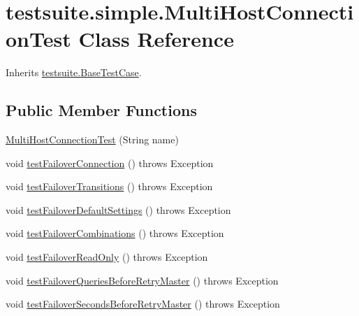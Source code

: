 \hypertarget{classtestsuite_1_1simple_1_1_multi_host_connection_test}{}\section{testsuite.\+simple.\+Multi\+Host\+Connection\+Test Class Reference}
\label{classtestsuite_1_1simple_1_1_multi_host_connection_test}


Inherits \mbox{\hyperlink{classtestsuite_1_1_base_test_case}{testsuite.\+Base\+Test\+Case}}.

\subsection*{Public Member Functions}
\begin{DoxyCompactItemize}
\item 
\mbox{\hyperlink{classtestsuite_1_1simple_1_1_multi_host_connection_test_a56eb52dfde0f334b08b56d1065f60104}{Multi\+Host\+Connection\+Test}} (String name)
\item 
void \mbox{\hyperlink{classtestsuite_1_1simple_1_1_multi_host_connection_test_ad753dcc54daa643efb93bb6296b446fb}{test\+Failover\+Connection}} ()  throws Exception 
\item 
void \mbox{\hyperlink{classtestsuite_1_1simple_1_1_multi_host_connection_test_ac73ab69db61b63a684b6d229fb83e97b}{test\+Failover\+Transitions}} ()  throws Exception 
\item 
void \mbox{\hyperlink{classtestsuite_1_1simple_1_1_multi_host_connection_test_ab41d61126e424b0903c7a6411d40a213}{test\+Failover\+Default\+Settings}} ()  throws Exception 
\item 
void \mbox{\hyperlink{classtestsuite_1_1simple_1_1_multi_host_connection_test_a3d67cb5298918a721fd213e23aad5d22}{test\+Failover\+Combinations}} ()  throws Exception 
\item 
void \mbox{\hyperlink{classtestsuite_1_1simple_1_1_multi_host_connection_test_a584998fbe06309864c8e535923ca3c2f}{test\+Failover\+Read\+Only}} ()  throws Exception 
\item 
void \mbox{\hyperlink{classtestsuite_1_1simple_1_1_multi_host_connection_test_a4497dff5cf4989cdacb5d7a771f8469a}{test\+Failover\+Queries\+Before\+Retry\+Master}} ()  throws Exception 
\item 
void \mbox{\hyperlink{classtestsuite_1_1simple_1_1_multi_host_connection_test_aac51a7111324e60d07760b3e52d7e2ea}{test\+Failover\+Seconds\+Before\+Retry\+Master}} ()  throws Exception 

\end{DoxyCompactItemize}
